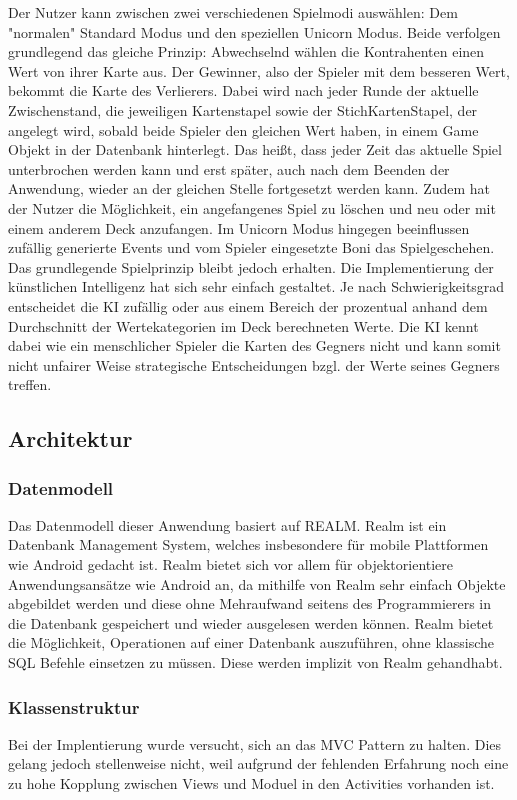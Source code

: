 \documentclass{scrartcl}
\begin{document}
\noindent
Der Nutzer kann zwischen zwei verschiedenen Spielmodi auswählen: Dem "normalen" Standard Modus und den speziellen Unicorn Modus.
Beide verfolgen grundlegend das gleiche Prinzip: Abwechselnd wählen die Kontrahenten einen Wert von ihrer Karte aus. Der Gewinner, also der Spieler mit dem besseren Wert, bekommt die Karte des Verlierers.
Dabei wird nach jeder Runde der aktuelle Zwischenstand, die jeweiligen Kartenstapel sowie der StichKartenStapel, der angelegt wird, sobald beide Spieler den gleichen Wert haben, in einem Game Objekt in der Datenbank hinterlegt.
Das heißt, dass jeder Zeit das aktuelle Spiel unterbrochen werden kann und erst später, auch nach dem Beenden der Anwendung, wieder an der gleichen Stelle fortgesetzt werden kann. Zudem hat der Nutzer die Möglichkeit, ein angefangenes Spiel zu löschen und
neu oder mit einem anderem Deck anzufangen.
\newline
Im Unicorn Modus hingegen beeinflussen zufällig generierte Events und vom Spieler eingesetzte Boni das Spielgeschehen. Das grundlegende Spielprinzip bleibt jedoch erhalten.
\newline
Die Implementierung der künstlichen Intelligenz hat sich sehr einfach gestaltet. Je nach Schwierigkeitsgrad entscheidet die KI zufällig oder aus einem Bereich der prozentual anhand dem Durchschnitt der Wertekategorien im Deck berechneten Werte.
Die KI kennt dabei wie ein menschlicher Spieler die Karten des Gegners nicht und kann somit nicht unfairer Weise strategische Entscheidungen bzgl. der Werte seines Gegners treffen.
 
\subsection{Architektur}
\subsubsection{Datenmodell}

\noindent
Das Datenmodell dieser Anwendung basiert auf REALM. Realm ist ein Datenbank Management System, welches insbesondere für mobile Plattformen wie Android gedacht ist. Realm bietet sich vor allem für objektorientiere Anwendungsansätze wie Android an, da
mithilfe von Realm sehr einfach Objekte abgebildet werden und diese ohne Mehraufwand seitens des Programmierers in die Datenbank gespeichert und wieder ausgelesen werden können. Realm bietet die Möglichkeit, Operationen auf einer Datenbank auszuführen, 
ohne klassische SQL Befehle einsetzen zu müssen. Diese werden implizit von Realm gehandhabt.

\subsubsection{Klassenstruktur}

\noindent
Bei der Implentierung wurde versucht, sich an das MVC Pattern zu halten. Dies gelang jedoch stellenweise nicht, weil aufgrund der fehlenden Erfahrung noch eine zu hohe Kopplung zwischen Views und Moduel in den Activities vorhanden ist.
\end{document}
